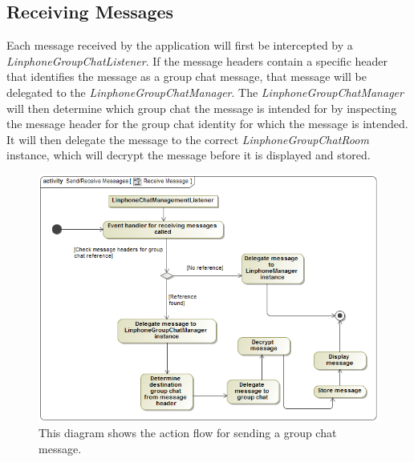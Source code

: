 \documentclass[11pt]{article}
\begin{document}
\subsection{Receiving Messages}
Each message received by the application will first be intercepted by a \textit{LinphoneGroupChatListener}. If the message headers contain a specific header that identifies the message as a group chat message, that message will be delegated to the \textit{LinphoneGroupChatManager}. The \textit{LinphoneGroupChatManager} will then determine which group chat the message is intended for by inspecting the message header for the group chat identity for which the message is intended. It will then delegate the message to the correct \textit{LinphoneGroupChatRoom} instance, which will decrypt the message before it is displayed and stored.
\begin{figure}[H]
\centering
\includegraphics[width=5in]{./images/activity_receive_message.png}
\caption[Receive Message Activity Diagram]{This diagram shows the action flow for sending a group chat message.}
\label{ad-receive-message}
\end{figure}
\end{document}
